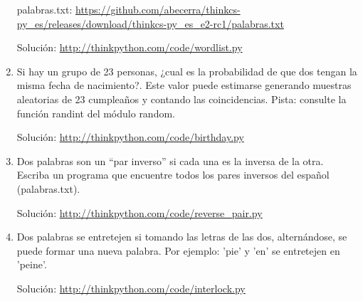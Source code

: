 \begin{enumerate}
palabras.txt: \url{https://github.com/abecerra/thinkcs-py_es/releases/download/thinkcs-py_es_e2-rc1/palabras.txt}

Solución: \url{http://thinkpython.com/code/wordlist.py}
\item Si hay un grupo de 23 personas, ¿cual es la probabilidad de que dos
tengan la misma fecha de nacimiento?. Este valor puede estimarse generando
muestras aleatorias de 23 cumpleaños y contando las coincidencias.
Pista: consulte la función randint del módulo random.

Solución: \url{http://thinkpython.com/code/birthday.py}
\item Dos palabras son un ``par inverso'' si cada una es la inversa de
la otra. Escriba un programa que encuentre todos los pares inversos
del español (palabras.txt).

Solución: \url{http://thinkpython.com/code/reverse_pair.py}
\item Dos palabras se entretejen si tomando las letras de las dos, alternándose,
se puede formar una nueva palabra. Por ejemplo: 'pie' y 'en' se entretejen
en 'peine'.

Solución: \url{http://thinkpython.com/code/interlock.py} 
\end{enumerate}

